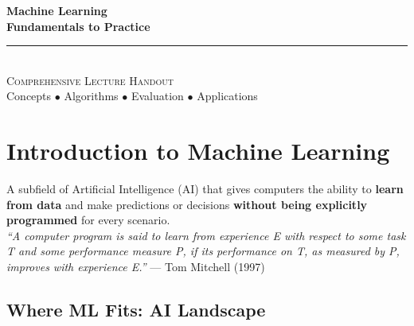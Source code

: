 \documentclass[11pt,a4paper]{article}
\begin{document}
\begin{center}
\vspace*{0.5cm}
{\Huge\bfseries\textcolor{primary}{Machine Learning}}\\[8pt]
{\Huge\bfseries\textcolor{primary}{Fundamentals to Practice}}\\[16pt]
{\color{secondary}\rule{0.6\textwidth}{1.5pt}}\\[14pt]
{\Large\textsc{Comprehensive Lecture Handout}}\\[8pt]
{\large\textcolor{gray!70!black}{Concepts $\bullet$ Algorithms $\bullet$ Evaluation $\bullet$ Applications}}
\vspace{0.3cm}
\end{center}
\tableofcontents
\newpage

\section{Introduction to Machine Learning}

\begin{definitionbox}
A subfield of Artificial Intelligence (AI) that gives computers the ability to \textbf{learn from data} and make predictions or decisions \textbf{without being explicitly programmed} for every scenario.\\[4pt]
\textit{``A computer program is said to learn from experience E with respect to some task T and some performance measure P, if its performance on T, as measured by P, improves with experience E.''} --- Tom Mitchell (1997)
\end{definitionbox}

\subsection{Where ML Fits: AI Landscape}
\end{document}

